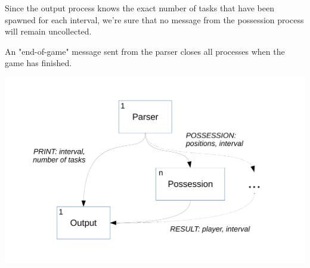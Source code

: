 \documentclass[a4paper]{article}
\begin{document}
Since the output process knows the exact number of tasks that have been spawned for each interval, we're sure that no message from the possession process will remain uncollected.

An "end-of-game" message sent from the parser closes all processes when the game has finished.

\begin{center}
\includegraphics[height=0.4\textheight]{diagramma.pdf}
\end{center}
\end{document}
